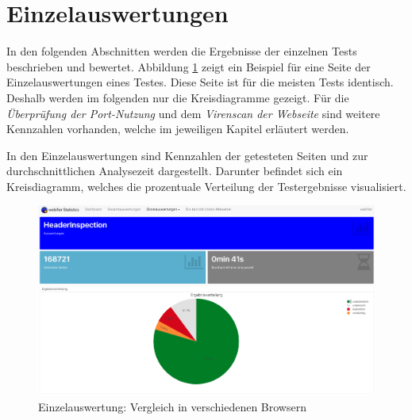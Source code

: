 \section{Einzelauswertungen}
In den folgenden Abschnitten werden die Ergebnisse der einzelnen Tests beschrieben und bewertet. Abbildung \ref{fig:analyse-headerinspection} zeigt ein Beispiel für eine Seite der Einzelauswertungen eines Testes. Diese Seite ist für die meisten Tests identisch. Deshalb werden im folgenden nur die Kreisdiagramme gezeigt. Für die \textit{Überprüfung der Port-Nutzung }und dem \textit{Virenscan der Webseite} sind weitere Kennzahlen vorhanden, welche im jeweiligen Kapitel erläutert werden.

In den Einzelauswertungen sind Kennzahlen der getesteten Seiten und zur durchschnittlichen Analysezeit dargestellt. Darunter befindet sich ein Kreisdiagramm, welches die prozentuale Verteilung der Testergebnisse visualisiert.
\begin{figure}[H]
  \centering
  \includegraphics[width=\textwidth]{images/stats/headerinspection}
  \caption[Einzelauswertung: Vergleich in verschiedenen Browsern]{Einzelauswertung: Vergleich in verschiedenen Browsern\protect\footnotemark}
  \label{fig:analyse-headerinspection}
\end{figure}

